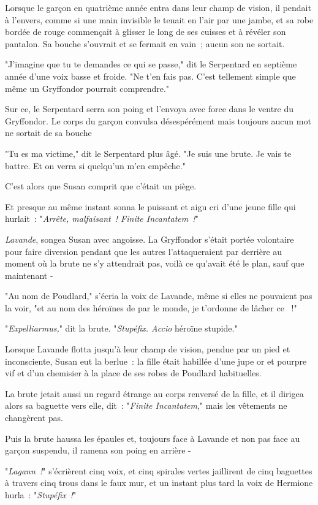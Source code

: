 Lorsque le garçon en quatrième année entra dans leur champ de vision, il pendait à l'envers, comme si une main invisible le tenait en l'air par une jambe, et sa robe bordée de rouge commençait à glisser le long de ses cuisses et à révéler son pantalon. Sa bouche s'ouvrait et se fermait en vain~; aucun son ne sortait.

"J'imagine que tu te demandes ce qui se passe," dit le Serpentard en septième année d'une voix basse et froide. "Ne t'en fais pas. C'est tellement simple que même un Gryffondor pourrait comprendre."

Sur ce, le Serpentard serra son poing et l'envoya avec force dans le ventre du Gryffondor. Le corps du garçon convulsa désespérément mais toujours aucun mot ne sortait de sa bouche

"Tu es ma victime," dit le Serpentard plus âgé. "Je suis une brute. Je vais te battre. Et on verra si quelqu'un m'en empêche."

C'est alors que Susan comprit que c'était un piège.

Et presque au même instant sonna le puissant et aigu cri d'une jeune fille qui hurlait~: "\emph{Arrête, malfaisant~! Finite Incantatem~!}"

\emph{Lavande}, songea Susan avec angoisse. La Gryffondor s'était portée volontaire pour faire diversion pendant que les autres l'attaqueraient par derrière au moment où la brute ne s'y attendrait pas, voilà ce qu'avait été le plan, sauf que maintenant -

"Au nom de Poudlard," s'écria la voix de Lavande, même si elles ne pouvaient pas la voir, "et au nom des héroïnes de par le monde, je t'ordonne de lâcher ce ~!"

"\emph{Expelliarmus,}" dit la brute. "\emph{Stupéfix. Accio} héroïne stupide."

Lorsque Lavande flotta jusqu'à leur champ de vision, pendue par un pied et inconsciente, Susan eut la berlue~: la fille était habillée d'une jupe or et pourpre vif et d'un chemisier à la place de ses robes de Poudlard habituelles.

La brute jetait aussi un regard étrange au corps renversé de la fille, et il dirigea alors sa baguette vers elle, dit~: "\emph{Finite Incantatem}," mais les vêtements ne changèrent pas.

Puis la brute haussa les épaules et, toujours face à Lavande et non pas face au garçon suspendu, il ramena son poing en arrière -

"\emph{Lagann~!}" s'écrièrent cinq voix, et cinq spirales vertes jaillirent de cinq baguettes à travers cinq trous dans le faux mur, et un instant plus tard la voix de Hermione hurla~: "\emph{Stupéfix~!}"

